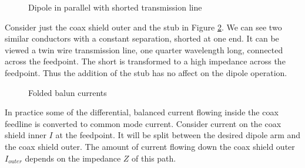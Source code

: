 \documentclass{article}
\begin{document}
\begin{figure}[h]
\caption{Dipole in parallel with shorted transmission line}
\label{fig:shorted}
\vspace{5mm}

\end{figure}

Consider just the coax shield outer and the stub in Figure \ref{fig:shorted}.  We can see two similar conductors with a constant separation, shorted at one end.  It can be viewed a twin wire transmission line, one quarter wavelength long, connected across the feedpoint.  The short is transformed to a high impedance across the feedpoint. Thus the addition of the stub has no affect on the dipole operation.

\begin{figure}[h]
\caption{Folded balun currents}
\label{fig:shorted}
\vspace{5mm}

\end{figure}

In practice some of the differential, balanced current flowing inside the coax feedline is converted to common mode current.  Consider current on the coax shield inner $I$ at the feedpoint.  It will be split between the desired dipole arm and the coax shield outer. The amount of current flowing down the coax shield outer $I_{outer}$ depends on the impedance $Z$ of this path.
\end{document}

